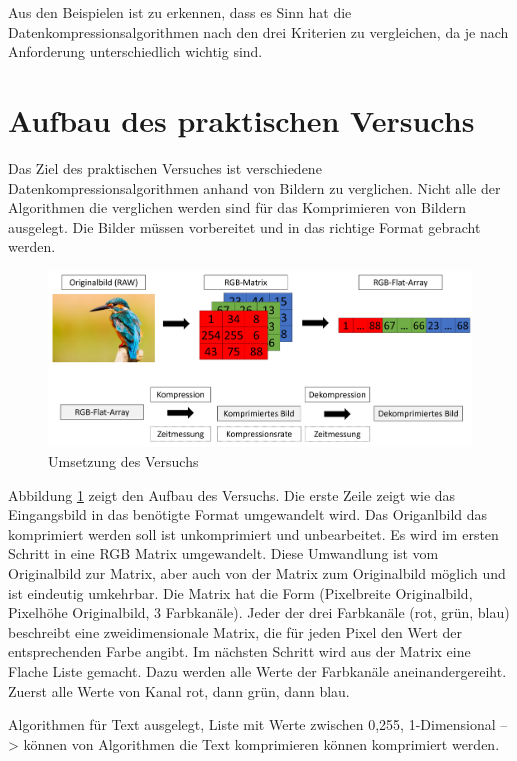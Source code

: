 \documentclass[conference]{IEEEtran}
\begin{document}
Aus den Beispielen ist zu erkennen, dass es Sinn hat die
Datenkompressionsalgorithmen nach den drei Kriterien zu vergleichen,
da je nach Anforderung unterschiedlich wichtig sind.


\section{Aufbau des praktischen Versuchs}

Das Ziel des praktischen Versuches ist verschiedene Datenkompressionsalgorithmen 
anhand von Bildern zu verglichen.
Nicht alle der Algorithmen die verglichen werden sind für das Komprimieren von 
Bildern ausgelegt.
Die Bilder müssen vorbereitet und in das richtige Format gebracht werden.

\begin{figure}[h]
    \label{fig:idea}
    \centering
    \includegraphics[width=\columnwidth]{./images/Idea.png}
    \caption{Umsetzung des Versuchs}
\end{figure}

Abbildung \ref{fig:idea} zeigt den Aufbau des Versuchs.
Die erste Zeile zeigt wie das Eingangsbild in das benötigte Format umgewandelt 
wird.
Das Origanlbild das komprimiert werden soll ist unkomprimiert und unbearbeitet.
Es wird im ersten Schritt in eine RGB Matrix umgewandelt.
Diese Umwandlung ist vom Originalbild zur Matrix, aber auch von der Matrix 
zum Originalbild möglich und ist eindeutig umkehrbar.
Die Matrix hat die Form (Pixelbreite Originalbild, Pixelhöhe Originalbild, 
3 Farbkanäle).
Jeder der drei Farbkanäle (rot, grün, blau) beschreibt eine zweidimensionale Matrix, 
die für jeden Pixel den Wert der entsprechenden Farbe angibt.
Im nächsten Schritt wird aus der Matrix eine Flache Liste gemacht.
Dazu werden alle Werte der Farbkanäle aneinandergereiht.
Zuerst alle Werte von Kanal rot, dann grün, dann blau.

Algorithmen für Text ausgelegt, Liste mit Werte zwischen 0,255, 1-Dimensional
--> können von Algorithmen die Text komprimieren können komprimiert werden.
\end{document}
